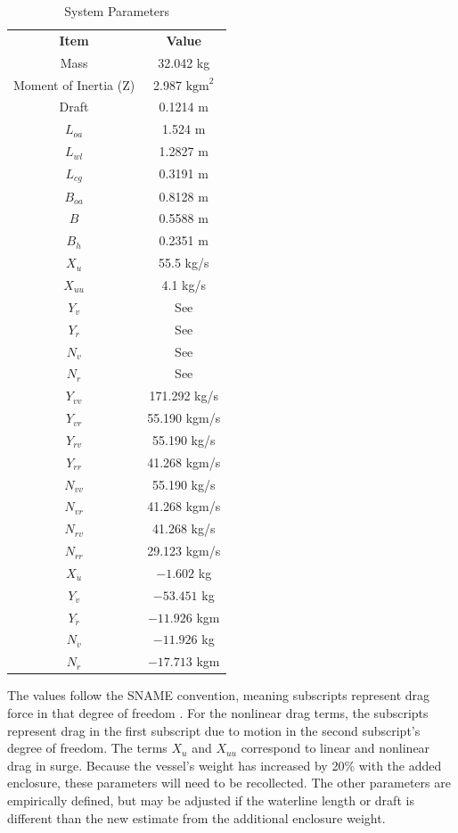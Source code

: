 \documentclass[letterpaper, 12 pt, conference]{ieeeconf}
\begin{document}
\begin{table}[tb]
\vspace{0.05in}
\caption{System Parameters}
\label{tab:SystemID}
\begin{center}
\begin{tabular}{cc}
\textbf{Item} & \textbf{Value}\\
Mass & 32.042 kg\\
Moment of Inertia (Z) & 2.987 $\text{kgm}^2$\\
Draft & 0.1214 m\\
$L_{oa}$ & 1.524 m\\
$L_{wl}$ & 1.2827 m\\
$L_{cg}$ & 0.3191 m\\
$B_{oa}$ & 0.8128 m\\
$B$ & 0.5588 m\\
$B_h$ & 0.2351 m\\
$X_u$ & 55.5 kg/s\\
$X_{uu}$ & 4.1 kg/s\\
$Y_v$ & See \cite{Klinger:17a, Sarda:16a}\\
$Y_r$ & See \cite{Klinger:17a, Sarda:16a}\\
$N_v$ & See \cite{Klinger:17a, Sarda:16a}\\
$N_r$ & See \cite{Klinger:17a, Sarda:16a}\\
$Y_{vv}$ & 171.292 kg/s\\
$Y_{vr}$ & 55.190 kgm/s\\
$Y_{rv}$ & 55.190 kg/s\\
$Y_{rr}$ & 41.268 kgm/s\\
$N_{vv}$ & 55.190 kg/s\\
$N_{vr}$ & 41.268 kgm/s\\
$N_{rv}$ & 41.268 kg/s\\
$N_{rr}$ & 29.123 kgm/s\\
$X_{\dot{u}}$ & $-1.602$ kg\\
$Y_{\dot{v}}$ & $-53.451$ kg\\
$Y_{\dot{r}}$ & $-11.926$ kgm\\
$N_{\dot{v}}$ &$-11.926$ kg\\
$N_{\dot{r}}$ & $-17.713$ kgm
\end{tabular}
\end{center}
\end{table}
%
The values follow the SNAME convention, meaning subscripts represent drag force in that degree of freedom \cite{SNAME:50a}. For the nonlinear drag terms, the subscripts represent drag in the first subscript due to motion in the second subscript's degree of freedom. The terms $X_u$ and $X_{uu}$ correspond to linear and nonlinear drag in surge. Because the vessel's weight has increased by 20\% with the added enclosure, these parameters will need to be recollected. The other parameters are empirically defined, but may be adjusted if the waterline length or draft is different than the new estimate from the additional enclosure weight.
\end{document}
